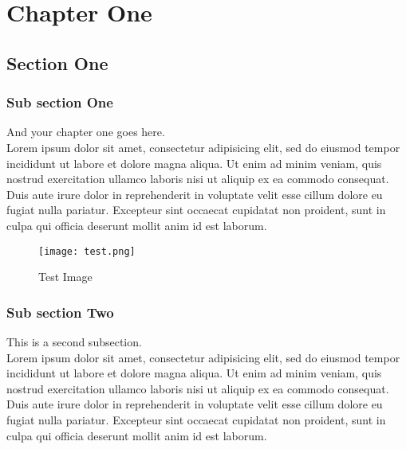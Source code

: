 
\chapter{Chapter One}%
\label{chap:chapter_one}

\section{Section One}
\label{chap:section_one}

  \subsection{Sub section One}

  And your chapter one goes here\cite{web001}\@. ~\\
  Lorem ipsum dolor sit amet, consectetur adipisicing elit, sed do eiusmod
  tempor incididunt ut labore et dolore magna aliqua. Ut enim ad minim veniam,
  quis nostrud exercitation ullamco laboris nisi ut aliquip ex ea commodo
  consequat. Duis aute irure dolor in reprehenderit in voluptate velit esse
  cillum dolore eu fugiat nulla pariatur. Excepteur sint occaecat cupidatat non
  proident, sunt in culpa qui officia deserunt mollit anim id est laborum.

  \begin{figure}[H]%
    \center%
    \texttt{[image: test.png]}%
    \caption[This is a test image]{Test Image}\label{fig:test}%
  \end{figure}

  \subsection{Sub section Two}

  This is a second subsection\cite{bazerman1988shaping}. ~\\
  Lorem ipsum dolor sit amet, consectetur adipisicing elit, sed do eiusmod
  tempor incididunt ut labore et dolore magna aliqua. Ut enim ad minim veniam,
  quis nostrud exercitation ullamco laboris nisi ut aliquip ex ea commodo
  consequat. Duis aute irure dolor in reprehenderit in voluptate velit esse
  cillum dolore eu fugiat nulla pariatur. Excepteur sint occaecat cupidatat non
  proident, sunt in culpa qui officia deserunt mollit anim id est laborum.

